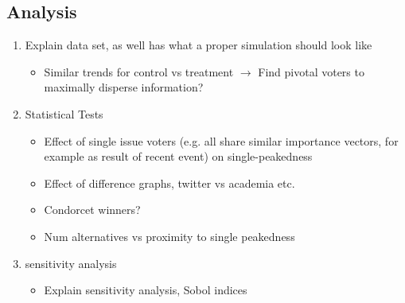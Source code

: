 \subsection{Analysis}
\begin{enumerate}
	\item Explain data set, as well has what a proper simulation should look like
	      \begin{itemize}
		      \item Similar trends for control vs treatment $\to$ Find pivotal voters to maximally disperse information?
	      \end{itemize}

	\item Statistical Tests

	      \begin{itemize}
		      \item Effect of single issue voters (e.g. all share similar importance vectors, for example as result of recent event) on single-peakedness
		      \item Effect of difference graphs, twitter vs academia etc.
		      \item Condorcet winners?
		      \item Num alternatives vs proximity to single peakedness
	      \end{itemize}
	\item sensitivity analysis
	      \begin{itemize}
		      \item Explain sensitivity analysis, Sobol indices
	      \end{itemize}
\end{enumerate}

